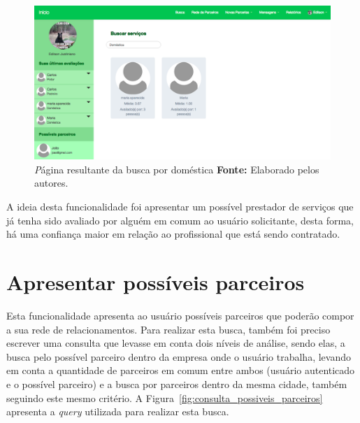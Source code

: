 \newpage
\begin{figure}[h!]
	\centerline{\includegraphics[scale=0.3]{./imagens/busca-domestica-edilson.png}}
	\caption[\textit Página resultante da busca por doméstica.]
	{\textit Página resultante da busca por doméstica \textbf{Fonte:} Elaborado pelos autores.}
	\label{fig:busca_domestica_edilson}
\end{figure}

\par A ideia desta funcionalidade foi apresentar um possível prestador de serviços que já tenha sido avaliado por alguém em comum ao usuário solicitante, desta forma, há uma confiança maior em relação ao profissional que está sendo contratado.


\section{Apresentar possíveis parceiros}

\par Esta funcionalidade apresenta ao usuário possíveis parceiros que poderão compor a sua rede de relacionamentos. Para realizar esta busca, também foi preciso escrever uma consulta que levasse em conta dois níveis de análise, sendo elas, a busca pelo possível parceiro dentro da empresa onde o usuário trabalha, levando em conta a quantidade de parceiros em comum entre ambos (usuário autenticado e o possível parceiro) e a busca por parceiros dentro da mesma cidade, também seguindo este mesmo critério. A Figura~\ref{fig:consulta_possiveis_parceiros} apresenta a \textit{query} utilizada para realizar esta busca.

\newpage

